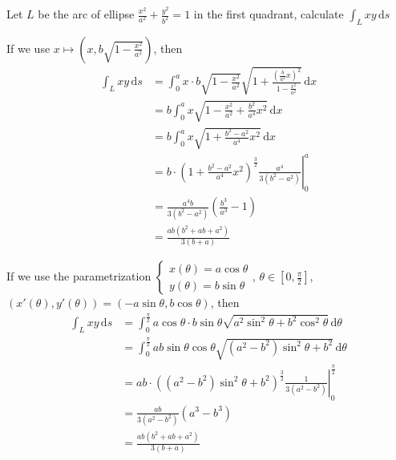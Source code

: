 \begin{example}
    Let $L$ be the arc of ellipse $\frac{x^2}{a^2}+\frac{y^2}{b^2}=1$ in the first quadrant, calculate $\int_L xy\,\mathrm{d}s$

    If we use $x\mapsto(x,b\sqrt{1-\frac{x^2}{a^2}})$, then
    \begin{align*}
        \int_L xy\,\mathrm{d}s
         & =\int_0^a x\cdot b\sqrt{1-\frac{x^2}{a^2}}\sqrt{1+\frac{(\frac{b}{a^2}x)^2}{1-\frac{x^2}{a^2}}}\,\mathrm{d}x \\
         & =b\int_0^a x\sqrt{1-\frac{x^2}{a^2}+\frac{b^2}{a^4}x^2}\,\mathrm{d}x                                         \\
         & =b\int_0^a x\sqrt{1+\frac{b^2-a^2}{a^4}x^2}\,\mathrm{d}x                                                     \\
         & =\left.b\cdot\left(1+\frac{b^2-a^2}{a^4}x^2\right)^{\frac{3}{2}}\frac{a^4}{3(b^2-a^2)}\right|_0^a            \\
         & =\frac{a^4b}{3(b^2-a^2)}\left(\frac{b^3}{a^3}-1\right)                                                       \\
         & =\frac{ab(b^2+ab+a^2)}{3(b+a)}
    \end{align*}

    If we use the parametrization $\begin{cases}
            x(\theta)=a\cos\theta \\
            y(\theta)=b\sin\theta
        \end{cases}$, $\theta\in\left[0,\frac{\pi}{2}\right]$,\\
    $(x'(\theta),y'(\theta))=(-a\sin\theta,b\cos\theta)$, then
    \begin{align*}
        \int_L xy\,\mathrm{d}s
         & =\int_0^{\frac{\pi}{2}}a\cos\theta\cdot b\sin\theta\sqrt{a^2\sin^2\theta+b^2\cos^2\theta}\,\mathrm{d}\theta \\
         & =\int_0^{\frac{\pi}{2}}ab\sin\theta\cos\theta\sqrt{(a^2-b^2)\sin^2\theta+b^2}\,\mathrm{d}\theta             \\
         & =\left.ab\cdot((a^2-b^2)\sin^2\theta+b^2)^{\frac{3}{2}}\frac{1}{3(a^2-b^2)}\right|_0^{\frac{\pi}{2}}        \\
         & =\frac{ab}{3(a^2-b^2)}\left(a^3-b^3\right)                                                                  \\
         & =\frac{ab(b^2+ab+a^2)}{3(b+a)}
    \end{align*}
\end{example}

